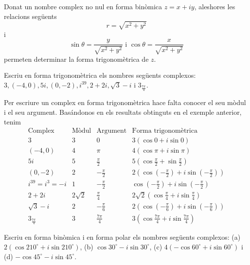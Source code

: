 Donat un nombre complex no nul en forma binòmica $z=x+iy$, aleshores
les relacions següents
\begin{equation*}
r=\sqrt{x^{2}+y^{2}}
\end{equation*}
i
\begin{equation*}
\sin \theta =\frac{y}{\sqrt{x^{2}+y^{2}}}\text{ \ \ i \ \ }\cos \theta =
\frac{x}{\sqrt{x^{2}+y^{2}}}
\end{equation*}
permeten determinar la forma trigonomètrica de $z$.

\begin{exemple}
Escriu en forma trigonomètrica els nombres següents complexos: $
3,(-4,0),5i,(0,-2),i^{39},2+2i,\sqrt{3}-i$ i $3_{\frac{7\pi }{4}}$.
\end{exemple}

\begin{solucio}
Per escriure un complex en forma trigonomètrica hace falta conocer el seu mòdul i el seu argument. Basándonos en els resultats obtinguts en el
exemple anterior, tenim
\begin{equation*}
\begin{array}{cccc}
\text{Complex} & \text{Mòdul} & \text{Argument} & \text{Forma trigonomètrica} \\
3 & 3 & 0 & 3(\cos 0+i\sin 0) \\
(-4,0) & 4 & \pi & 4(\cos \pi +i\sin \pi ) \\
5i & 5 & \frac{\pi }{2} & 5\left( \cos \frac{\pi }{2}+\sin \frac{\pi }{2}
\right) \\
(0,-2) & 2 & -\frac{\pi }{2} & 2\left( \cos \left( -\frac{\pi }{2}\right)
+i\sin \left( -\frac{\pi }{2}\right) \right) \\
i^{39}=i^{3}=-i & 1 & -\frac{\pi }{2} & \cos \left( -\frac{\pi }{2}\right)
+i\sin \left( -\frac{\pi }{2}\right) \\
2+2i & 2\sqrt{2} & \frac{\pi }{4} & 2\sqrt{2}\left( \cos \frac{\pi }{4}
+i\sin \frac{\pi }{4}\right) \\
\sqrt{3}-i & 2 & -\frac{\pi }{6} & 2\left( \cos \left( -\frac{\pi }{6}
\right) +i\sin \left( -\frac{\pi }{6}\right) \right) \\
3_{\frac{7\pi }{4}} & 3 & \frac{7\pi }{4} & 3\left( \cos \frac{7\pi }{4}
+i\sin \frac{7\pi }{4}\right)
\end{array}
\end{equation*}
\end{solucio}

\begin{exemple}
Escriu en forma binòmica i en forma polar els nombres següents
complexos: (a) $2(\cos 210
^{\circ}
+i\sin 210
^{\circ}
)$, (b) $\cos 30
^{\circ}
-i\sin 30
^{\circ}
$, (c) $4(-\cos 60
^{\circ}
+i\sin 60
^{\circ}
)$ i (d) $-\cos 45
^{\circ}
-i\sin 45
^{\circ}
$.
\end{exemple}

